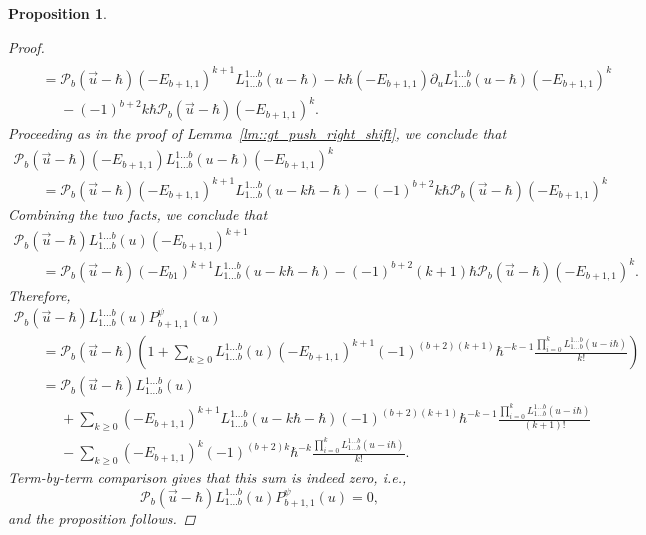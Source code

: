 \documentclass[10pt,a4paper]{article}
\numberwithin{equation}{section}
\newtheorem{Proposition}[Theorem]{Proposition}
{ \theoremstyle{definition}
	\newtheorem{Definition}[Theorem]{Definition}
	\newtheorem{Note}[Theorem]{Note}
	\newtheorem{Example}[Theorem]{Example}
	\newtheorem{Remark}[Theorem]{Remark} }
\newcommand{\calP}{\mathcal{P}}
\begin{document}
\begin{Proposition}
\begin{proof}
\begin{gather*}
 \\
				\qquad= \calP_{b}(\vec{u}-\hbar) (-E_{b+1,1})^{k+1} L_{1\dots b}^{1\dots b}(u-\hbar) - k\hbar (-E_{b+1,1}) \partial_u L_{1\dots b}^{1\dots b}(u-\hbar) (-E_{b+1,1})^k \\
				\phantom{\qquad=}{}- (-1)^{b+2} k\hbar \calP_{b}(\vec{u}-\hbar) (-E_{b+1,1})^k.
			\end{gather*}
			Proceeding as in the proof of Lemma~\ref{lm::gt_push_right_shift}, we conclude that
			\begin{gather*}
				\calP_{b}(\vec{u}-\hbar) (-E_{b+1,1}) L_{1\dots b}^{1\dots b}(u-\hbar) (-E_{b+1,1})^{k} \\
				\qquad=\calP_{b}(\vec{u}-\hbar) (-E_{b+1,1})^{k+1} L_{1\dots b}^{1\dots b}(u-k\hbar-\hbar) - (-1)^{b+2} k\hbar \calP_{b}(\vec{u}-\hbar) (-E_{b+1,1})^k
			\end{gather*}
			Combining the two facts, we conclude that
			\begin{gather*}
				\calP_{b}(\vec{u}-\hbar) L_{1\dots b}^{1\dots b}(u) (-E_{b+1,1})^{k+1} \\
			\qquad	= \calP_{b}(\vec{u}-\hbar) (-E_{b1})^{k+1} L_{1\dots b}^{1\dots b} (u-k\hbar-\hbar) - (-1)^{b+2} (k+1)\hbar \calP_{b}(\vec{u}-\hbar) (-E_{b+1,1})^k.
			\end{gather*}
			Therefore,
			\begin{gather*}
				\calP_{b}(\vec{u}-\hbar) L_{1\dots b}^{1\dots b}(u) P_{b+1,1}^{\psi}(u) \\
				\qquad= \calP_{b}(\vec{u}-\hbar) \left( 1 + \sum\limits_{k\geq 0} L_{1\dots b}^{1\dots b}(u) (-E_{b+1,1})^{k+1} (-1)^{(b+2)(k+1)} \hbar^{-k-1} \frac{\prod_{i=0}^{k} L_{1\dots b}^{1\dots b}(u-i\hbar)}{k!} \right)\\
				\qquad= \calP_{b}(\vec{u}-\hbar) L_{1\dots b}^{1\dots b}(u) \\
			\phantom{\qquad=}{}	+\sum\limits_{k\geq 0} (-E_{b+1,1})^{k+1} L_{1\dots b}^{1\dots b}(u-k\hbar-\hbar) (-1)^{(b+2)(k+1)} \hbar^{-k-1} \frac{\prod_{i=0}^{k} L_{1\dots b}^{1\dots b}(u-i\hbar)}{(k+1)!} \\
			\phantom{\qquad=}{}	- \sum\limits_{k\geq 0} (-E_{b+1,1})^k (-1)^{(b+2)k} \hbar^{-k} \frac{\prod_{i=0}^{k} L_{1\dots b}^{1\dots b}(u-i\hbar)}{k!}.
			\end{gather*}
			Term-by-term comparison gives that this sum is indeed zero, i.e.,
			\[
			\calP_{b}(\vec{u}-\hbar) L_{1\dots b}^{1\dots b}(u) P_{b+1,1}^{\psi}(u) = 0,
			\]
			and the proposition follows.
		\end{proof}
	\end{Proposition}
	
\end{document}
